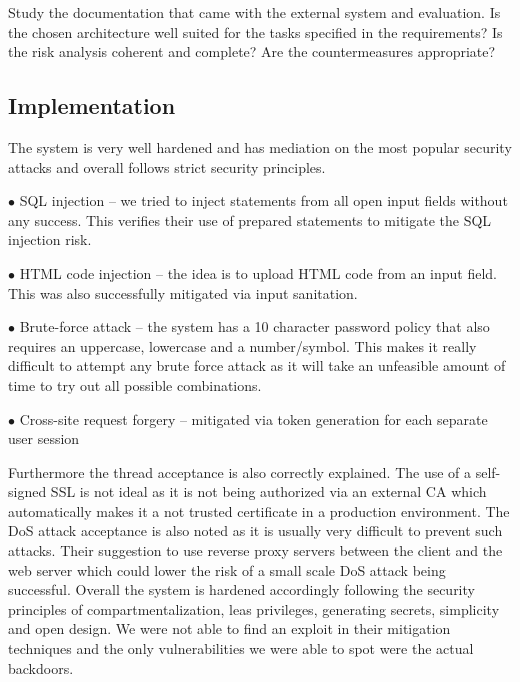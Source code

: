 \documentclass{article}
\begin{document}
Study the documentation that came with the external system and
evaluation.
Is the chosen architecture well suited for the tasks specified in the 
requirements?  Is the risk analysis coherent and complete?   Are the
countermeasures appropriate?

\subsection{Implementation}

The system is very well hardened and has mediation on the most popular security attacks and overall follows strict security principles.

\begin{description}
\item $\bullet$ SQL injection – we tried to inject statements from all open input fields without any success. This verifies their use of prepared statements to mitigate the SQL injection risk.
\item $\bullet$ HTML code injection – the idea is to upload HTML code from an input field. This was also successfully mitigated via input sanitation.
\item $\bullet$ Brute-force attack – the system has a 10 character password policy that also requires an uppercase, lowercase and a number/symbol. This makes it really difficult to attempt any brute force attack as it will take an unfeasible amount of time to try out all possible combinations.
\item $\bullet$ Cross-site request forgery – mitigated via token generation for each separate user session
\end{description}

Furthermore the thread acceptance is also correctly explained. The use of a self-signed SSL is not ideal as it is not being authorized via an external CA which automatically makes it a not trusted certificate in a production environment. The DoS attack acceptance is also noted as it is usually very difficult to prevent such attacks. Their suggestion to use reverse proxy servers between the client and the web server which could lower the risk of a small scale DoS attack being successful. 
\newline
Overall the system is hardened accordingly following the security principles of compartmentalization, leas privileges, generating secrets, simplicity and open design. We were not able to find an exploit in their mitigation techniques and the only vulnerabilities we were able to spot were the actual backdoors.
\end{document}
